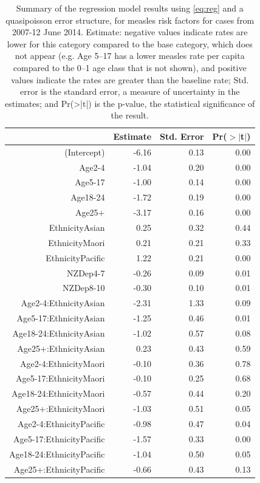\documentclass{article}
\begin{document}
\vspace{5mm} %
\begin{table}
\begin{center}
\begin{tabular}{rrrr}
  \hline
 & Estimate & Std. Error & Pr($>$$|$t$|$) \\ 
  \hline
(Intercept) & -6.16 & 0.13 & 0.00 \\ 
  Age2-4 & -1.04 & 0.20 & 0.00 \\ 
  Age5-17 & -1.00 & 0.14 & 0.00 \\ 
  Age18-24 & -1.72 & 0.19 & 0.00 \\ 
  Age25+ & -3.17 & 0.16 & 0.00 \\ 
  EthnicityAsian & 0.25 & 0.32 & 0.44 \\ 
  EthnicityMaori & 0.21 & 0.21 & 0.33 \\ 
  EthnicityPacific & 1.22 & 0.21 & 0.00 \\ 
  NZDep4-7 & -0.26 & 0.09 & 0.01 \\ 
  NZDep8-10 & -0.30 & 0.10 & 0.01 \\ 
  Age2-4:EthnicityAsian & -2.31 & 1.33 & 0.09 \\ 
  Age5-17:EthnicityAsian & -1.25 & 0.46 & 0.01 \\ 
  Age18-24:EthnicityAsian & -1.02 & 0.57 & 0.08 \\ 
  Age25+:EthnicityAsian & 0.23 & 0.43 & 0.59 \\ 
  Age2-4:EthnicityMaori & -0.10 & 0.36 & 0.78 \\ 
  Age5-17:EthnicityMaori & -0.10 & 0.25 & 0.68 \\ 
  Age18-24:EthnicityMaori & -0.57 & 0.44 & 0.20 \\ 
  Age25+:EthnicityMaori & -1.03 & 0.51 & 0.05 \\ 
  Age2-4:EthnicityPacific & -0.98 & 0.47 & 0.04 \\ 
  Age5-17:EthnicityPacific & -1.57 & 0.33 & 0.00 \\ 
  Age18-24:EthnicityPacific & -1.04 & 0.50 & 0.05 \\ 
  Age25+:EthnicityPacific & -0.66 & 0.43 & 0.13 \\ 
   \hline
\end{tabular}\caption{Summary of the regression model results using \autoref{eq:reg} and a quasipoisson error structure, for measles risk factors for cases from 2007-12 June 2014. Estimate: negative values indicate rates are lower for this category compared to the base category, which does not appear (e.g. Age 5--17 has a lower measles rate per capita compared to the 0--1 age class that is not shown), and positive values indicate the rates are greater than the baseline rate; Std. error is the standard error, a measure of uncertainty in the estimates; and Pr(>|t|) is the p-value, the statistical significance of the result.}
\label{table:regression_riskfactors}
\end{center}
\end{table}
\end{document}
